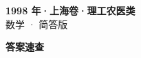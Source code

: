 \documentclass[zihao=-4, a4paper]{ctexart}
\begin{document}
\begin{center}
  {\Large\bfseries 1998 年·上海卷·理工农医类}\\[4pt]
  {\large 数学 · 简答版}
\end{center}
\medskip
{}

\clearpage
{}
\begin{center}{\Large\bfseries 答案速查}\end{center}
\medskip

\end{document}
